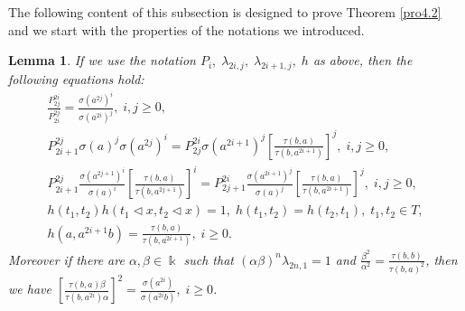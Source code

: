 \documentclass[a4paper,11pt]{amsart}
\numberwithin{equation}{section}
\newtheorem{lemma}[theorem]{Lemma}
\begin{document}
The following content of this subsection is designed to prove Theorem \ref{pro4.2} and we start with the properties of the notations we introduced.
\begin{lemma}\label{lem4.1}
If we use the notation $P_i,\;\lambda_{2i,j},\;\lambda_{2i+1,j},\;h$ as above, then the following equations hold:
\begin{gather}
\label{4.b1} \frac{P_{2j}^{2i}}{P_{2i}^{2j}}=\frac{\sigma(a^{2j})^{i}}{\sigma(a^{2i})^{j}},\; i,j\geq 0,\\
\label{4.b3} P_{2i+1}^{2j}\sigma(a)^j\sigma(a^{2j})^i=P_{2j}^{2i}\sigma(a^{2i+1})^j
[\frac{\tau(b,a)}{\tau(b,a^{2i+1})}]^j,\;i,j\geq 0,\\
\label{4.b4} P_{2i+1}^{2j} \frac{\sigma(a^{2j+1})^i}{\sigma(a)^i}[\frac{\tau(b,a)}{\tau(b,a^{2j+1})}]^i=
P_{2j+1}^{2i} \frac{\sigma(a^{2i+1})^j}{\sigma(a)^j}[\frac{\tau(b,a)}{\tau(b,a^{2i+1})}]^j,\;i,j\geq 0,\\
\label{4.b5}
h(t_1,t_2)h(t_1\triangleleft x, t_2\triangleleft x)=1,\;h(t_1,t_2)=h(t_2,t_1),\;t_1,t_2\in T,\\
\label{4.b6}
h(a,a^{2i+1}b)=\frac{\tau(b,a)}{\tau(b,a^{2i+1})},\;i\geq 0.
\end{gather}
Moreover if there are $\alpha,\beta \in \Bbbk$ such that $(\alpha\beta)^n \lambda_{2n,1}=1$ and $\frac{\beta^2}{\alpha^2}=\frac{\tau(b,b)}{\tau(b,a)^2}$, then we have $[\frac{\tau(b,a)\beta}{\tau(b,a^{2i})\alpha}]^2=\frac{\sigma(a^{2i})}{\sigma(a^{2i}b)},\; i\geq 0$.
\end{lemma}
\end{document}
